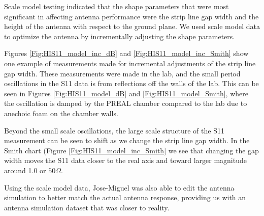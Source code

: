Scale model testing indicated that the shape parameters that were most significant in affecting antenna performance were the strip line gap width and the height of the antenna with respect to the ground plane. We used scale model data to optimize the antenna by incrementally adjusting the shape parameters. 

Figures \ref{Fig:HIS11_model_inc_dB} and \ref{Fig:HIS11_model_inc_Smith} show one example of measurements made for incremental adjustments of the strip line gap width. These measurements were made in the lab, and the small period oscillations in the S11 data is from reflections off the walls of the lab. This can be seen in Figures \ref{Fig:HIS11_model_dB} and \ref{Fig:HIS11_model_Smith}, where the oscillation is damped by the PREAL chamber compared to the lab due to anechoic foam on the chamber walls. 

Beyond the small scale oscillations, the large scale structure of the S11 measurement can be seen to shift as we change the strip line gap width. In the Smith chart (Figure \ref{Fig:HIS11_model_inc_Smith} we see that changing the gap width moves the S11 data closer to the real axis and toward larger magnitude around 1.0 or $50 \Omega$. 

Using the scale model data, Jose-Miguel was also able to edit the antenna simulation to better match the actual antenna response, providing us with an antenna simulation dataset that was closer to reality. 

